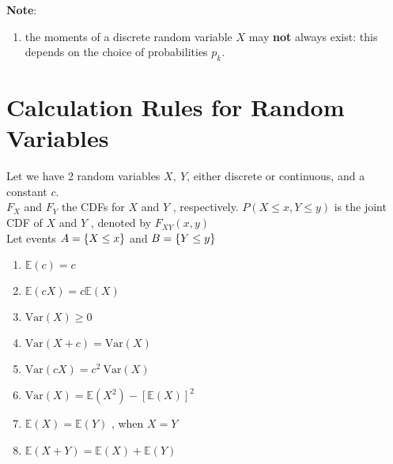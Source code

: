 \vspace{0.5cm}
\textbf{Note}:
\begin{enumerate}
    \item the moments of a discrete random variable $X$ may \textbf{not} always exist: this depends on the choice of probabilities $p _k $.
    \hfill \cite{statistics/book/Statistics-for-Data-Scientists/Maurits-Kaptein}
\end{enumerate}


\section{Calculation Rules for Random Variables}

Let we have 2 random variables $X, \ Y$, either discrete or continuous, and a constant $c$.
\\
$F _X$ and $F_Y$ the CDFs for $X$ and $Y$ , respectively. $P(X \leq x, Y \leq y)$ is the joint CDF
of $X$ and $Y$ , denoted by $F _{X Y} (x, y)$
\\
Let events $A = \left\{X \leq x\right\}$ and $B = \left\{Y \leq y\right\}$

\begin{multicols}{2}
\begin{enumerate}[series=calcrulesrv]
    \item $\mathbb{E} (c) = c$
    \hfill \cite{statistics/book/Statistics-for-Data-Scientists/Maurits-Kaptein}

    \item $\mathbb{E} (cX) = c \mathbb{E} (X)$
    \hfill \cite{statistics/book/Statistics-for-Data-Scientists/Maurits-Kaptein}

    \item $\text{Var}(X) \geq 0$
    \hfill \cite{statistics/book/Statistics-for-Data-Scientists/Maurits-Kaptein}

    \item $\text{Var}(X + c) = \text{Var}(X)$
    \hfill \cite{statistics/book/Statistics-for-Data-Scientists/Maurits-Kaptein}

    \item $\text{Var}(cX) = c^2\ \text{Var}(X)$
    \hfill \cite{statistics/book/Statistics-for-Data-Scientists/Maurits-Kaptein}

    \item $\text{Var}(X) = \mathbb{E}(X^2) - [\mathbb{E}(X)]^2$
    \hfill \cite{statistics/book/Statistics-for-Data-Scientists/Maurits-Kaptein}

    \item $\mathbb{E} (X) = \mathbb{E} (Y )$ , when $X = Y$
    \hfill \cite{statistics/book/Statistics-for-Data-Scientists/Maurits-Kaptein}

    \item $\mathbb{E} (X + Y ) = \mathbb{E} (X) + \mathbb{E} (Y )$
    \hfill \cite{statistics/book/Statistics-for-Data-Scientists/Maurits-Kaptein}
\end{enumerate}
\end{multicols}

